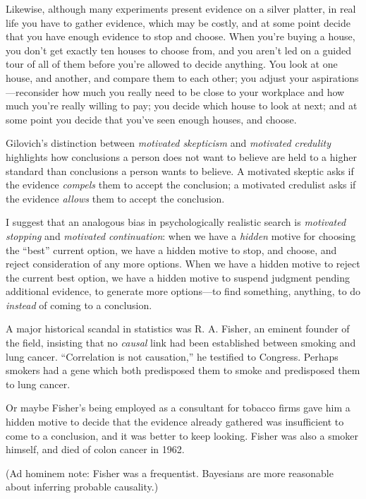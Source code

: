 {
 Likewise, although many experiments present evidence on a silver
platter, in real life you have to gather evidence, which may be costly,
and at some point decide that you have enough evidence to stop and
choose. When you're buying a house, you
don't get exactly ten houses to choose from, and you
aren't led on a guided tour of all of them before
you're allowed to decide anything. You look at one
house, and another, and compare them to each other; you adjust your
aspirations---reconsider how much you really need to be close to your
workplace and how much you're really willing to pay;
you decide which house to look at next; and at some point you decide
that you've seen enough houses, and choose.}

{
 Gilovich's distinction between \textit{motivated
skepticism} and \textit{motivated credulity} highlights how conclusions
a person does not want to believe are held to a higher standard than
conclusions a person wants to believe. A motivated skeptic asks if the
evidence \textit{compels} them to accept the conclusion; a motivated
credulist asks if the evidence \textit{allows} them to accept the
conclusion.}

{
 I suggest that an analogous bias in psychologically realistic
search is \textit{motivated stopping} and \textit{motivated
continuation}: when we have a \textit{hidden} motive for choosing the
``best'' current option, we have a
hidden motive to stop, and choose, and reject consideration of any more
options. When we have a hidden motive to reject the current best
option, we have a hidden motive to suspend judgment pending additional
evidence, to generate more options---to find something, anything, to do
\textit{instead} of coming to a conclusion.}

{
 A major historical scandal in statistics was R. A. Fisher, an
eminent founder of the field, insisting that no \textit{causal} link
had been established between smoking and lung cancer.
``Correlation is not causation,'' he
testified to Congress. Perhaps smokers had a gene which both
predisposed them to smoke and predisposed them to lung cancer.}

{
 Or maybe Fisher's being employed as a consultant
for tobacco firms gave him a hidden motive to decide that the evidence
already gathered was insufficient to come to a conclusion, and it was
better to keep looking. Fisher was also a smoker himself, and died of
colon cancer in 1962.}

{
 (Ad hominem note: Fisher was a frequentist. Bayesians are more
reasonable about inferring probable causality.)}

